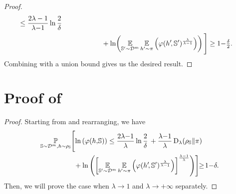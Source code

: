 \begin{noaddcontents}
\begin{proof}
\begin{align}
    \le\frac{2\lambda-1}{\lambda{-}1}\ln\frac{2}{\delta}\nonumber\\
    &\hspace{2cm}+\ln\!\left(\operatorname*{\mathbb{E}}_{\mathbb{S}'{\sim}\mathcal{D}^{m}}\operatorname*{\mathbb{E}}_{h'{\sim}\pi}\left(\varphi(h'\!, \mathbb{S}')^{\frac{\lambda}{\lambda-1}}\right)\right)\Bigg]\ge 1{-}\tfrac{\delta}{2}.
    \label{chap:dis-pra:eq:disintegrated-proof-2}
\end{align}
Combining  with a union bound gives us the desired result.
\end{proof}

\section{Proof of }
\label{chap:dis-pra:sec:proof-corollary-disintegrated}

\corollarydisintegrated*
\begin{proof} 
Starting from  and rearranging, we have
\begin{align*}
    \PP_{\S\sim\D^{\m},\h\sim \AQ}\!\Bigg[\! &\ln\LP\varphi(\h,\!\S)\RP \le {\frac{2\lambda{-}1}{\lambda}}\ln\frac{2}{\delta}\, +\frac{\lambda{-}1}{\lambda}\Renyi_{\lambda}(\AQ\|\P)\\
    &+ \ln\LP\LB\EE_{\S'{\sim}\D^{\m}}\EE_{\h'{\sim}\P}\LP\varphi(\h'\!, \S')^{\frac{\lambda}{\lambda{-}1}}\RP\RB^{\frac{\lambda{-}1}{\lambda}}\RP \!\Bigg]\!\!\ge\! 1{-}\delta.
\end{align*}
Then, we will prove the case when $\lambda\rightarrow 1$ and $\lambda\rightarrow +\infty$ separately.


\end{proof}
\end{noaddcontents}
